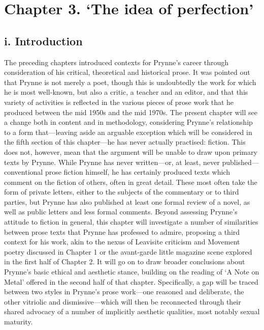 \documentclass[]{article}
\begin{document}
\section{Chapter 3. ‘The idea of
perfection’}\label{chapter-3.-the-idea-of-perfection}

\subsection{i. Introduction}\label{i.-introduction-2}

The preceding chapters introduced contexts for Prynne’s career through
consideration of his critical, theoretical and historical prose. It was
pointed out that Prynne is not merely a poet, though this is undoubtedly
the work for which he is most well-known, but also a critic, a teacher
and an editor, and that this variety of activities is reflected in the
various pieces of prose work that he produced between the mid 1950s and
the mid 1970s. The present chapter will see a change both in content and
in methodology, considering Prynne’s relationship to a form that—leaving
aside an arguable exception which will be considered in the fifth
section of this chapter—he has never actually practised: fiction. This
does not, however, mean that the argument will be unable to draw upon
primary texts by Prynne. While Prynne has never written—or, at least,
never published—conventional prose fiction himself, he has certainly
produced texts which comment on the fiction of others, often in great
detail. These most often take the form of private letters, either to the
subjects of the commentary or to third parties, but Prynne has also
published at least one formal review of a novel, as well as public
letters and less formal comments. Beyond assessing Prynne’s attitude to
fiction in general, this chapter will investigate a number of
similarities between prose texts that Prynne has professed to admire,
proposing a third context for his work, akin to the nexus of Leavisite
criticism and Movement poetry discussed in Chapter 1 or the avant-garde
little magazine scene explored in the first half of Chapter 2. It will
go on to draw broader conclusions about Prynne’s basic ethical and
aesthetic stance, building on the reading of ‘A Note on Metal’ offered
in the second half of that chapter. Specifically, a gap will be traced
between two styles in Prynne’s prose work—one reasoned and deliberate,
the other vitriolic and dismissive—which will then be reconnected
through their shared advocacy of a number of implicitly aesthetic
qualities, most notably sexual maturity.
\end{document}
